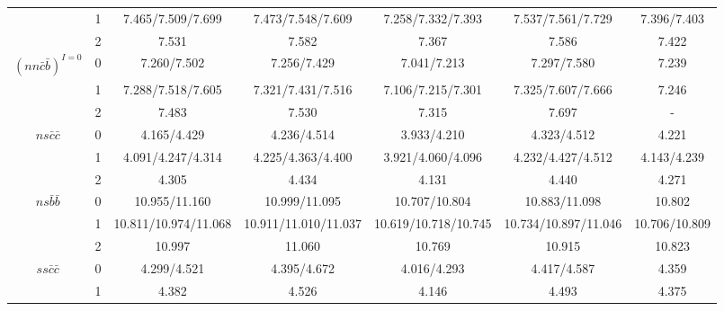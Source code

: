 \documentclass[prt,twocolumn,floatfix,nofootinbib]{revtex4}
\begin{document}
\begin{table}[!htbp]
\begin{tabular}{ccccccc}
                        &1      &7.465/7.509/7.699      &7.473/7.548/7.609                   &7.258/7.332/7.393                   &7.537/7.561/7.729      &7.396/7.403 \\
                        &2      &7.531                  &7.582                               &7.367                               &7.586                  &7.422 \\
        ${(nn\bar{c}\bar{b})}^{I=0}$
                        &0      &7.260/7.502            &7.256/7.429                         &7.041/7.213                         &7.297/7.580            &7.239 \\
                        &1      &7.288/7.518/7.605      &7.321/7.431/7.516                   &7.106/7.215/7.301                   &7.325/7.607/7.666      &7.246 \\
                        &2      &7.483                  &7.530                               &7.315                               &7.697                  &- \\
        $ns\bar{c}\bar{c}$
                        &0      &4.165/4.429            &4.236/4.514                         &3.933/4.210                         &4.323/4.512            &4.221 \\
                        &1      &4.091/4.247/4.314      &4.225/4.363/4.400                   &3.921/4.060/4.096                   &4.232/4.427/4.512      &4.143/4.239 \\
                        &2      &4.305                  &4.434                               &4.131                               &4.440                  &4.271 \\
        $ns\bar{b}\bar{b}$
                        &0      &10.955/11.160          &10.999/11.095                       &10.707/10.804                       &10.883/11.098          &10.802 \\
                        &1      &10.811/10.974/11.068   &10.911/11.010/11.037                &10.619/10.718/10.745                &10.734/10.897/11.046   &10.706/10.809 \\
                        &2      &10.997                 &11.060                              &10.769                              &10.915                 &10.823 \\
        $ss\bar{c}\bar{c}$
                        &0      &4.299/4.521            &4.395/4.672                         &4.016/4.293                         &4.417/4.587            &4.359 \\
                        &1      &4.382                  &4.526                               &4.146                               &4.493                  &4.375 \\

\end{tabular}
\end{table}
\end{document}
